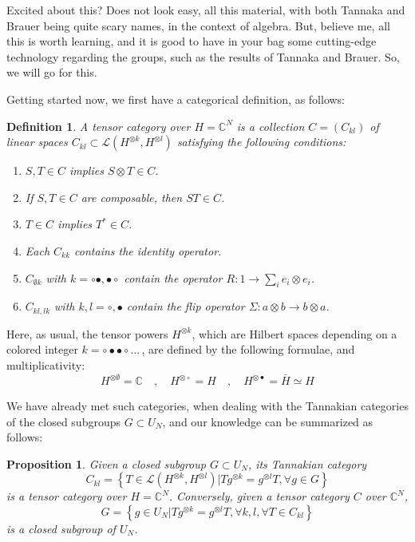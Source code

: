 \documentclass[12pt]{amsbook}
\newtheorem{definition}[theorem]{Definition}
\newtheorem{proposition}[theorem]{Proposition}
\begin{document}
Excited about this? Does not look easy, all this material, with both Tannaka and Brauer being quite scary names, in the context of algebra. But, believe me, all this is worth learning, and it is good to have in your bag some cutting-edge technology regarding the groups, such as the results of Tannaka and Brauer. So, we will go for this.

\bigskip

Getting started now, we first have a categorical definition, as follows:

\begin{definition}
A tensor category over $H=\mathbb C^N$ is a collection $C=(C_{kl})$ of linear spaces $C_{kl}\subset\mathcal L(H^{\otimes k},H^{\otimes l})$ satisfying the following conditions:
\begin{enumerate}
\item $S,T\in C$ implies $S\otimes T\in C$.

\item If $S,T\in C$ are composable, then $ST\in C$.

\item $T\in C$ implies $T^*\in C$.

\item Each $C_{kk}$ contains the identity operator.

\item $C_{\emptyset k}$ with $k=\circ\bullet,\bullet\circ$ contain the operator $R:1\to\sum_ie_i\otimes e_i$.

\item $C_{kl,lk}$ with $k,l=\circ,\bullet$ contain the flip operator $\Sigma:a\otimes b\to b\otimes a$.
\end{enumerate}
\end{definition}

Here, as usual, the tensor powers $H^{\otimes k}$, which are Hilbert spaces depending on a colored integer $k=\circ\bullet\bullet\circ\ldots\,$, are defined by the following formulae, and multiplicativity:
$$H^{\otimes\emptyset}=\mathbb C\quad,\quad 
H^{\otimes\circ}=H\quad,\quad
H^{\otimes\bullet}=\bar{H}\simeq H$$

We have already met such categories, when dealing with the Tannakian categories of the closed subgroups $G\subset U_N$, and our knowledge can be summarized as follows:

\begin{proposition}
Given a closed subgroup $G\subset U_N$, its Tannakian category
$$C_{kl}=\left\{T\in\mathcal L(H^{\otimes k},H^{\otimes l})\Big|Tg^{\otimes k}=g^{\otimes l}T,\forall g\in G\right\}$$
is a tensor category over $H=\mathbb C^N$. Conversely, given a tensor category $C$ over $\mathbb C^N$,
$$G=\left\{g\in U_N\Big|Tg^{\otimes k}=g^{\otimes l}T,\forall k,l,\forall T\in C_{kl}\right\}$$
is a closed subgroup of $U_N$.
\end{proposition}
\end{document}
